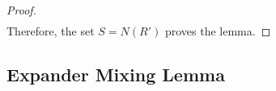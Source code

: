 \begin{proof}
\begin{align*}
	\end{align*}
	Therefore, the set $S = N(R')$ proves the lemma.
\end{proof}

\subsection{Expander Mixing Lemma}


